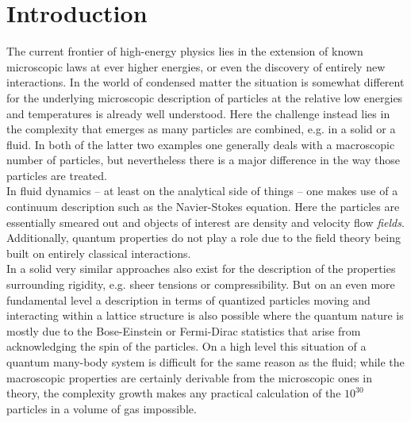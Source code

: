 \chapter{Introduction}\label{chap:int}
The current frontier of high-energy physics lies in the extension of known microscopic laws at ever higher energies, or even the discovery of entirely new interactions.
In the world of condensed matter the situation is somewhat different for the underlying microscopic description of particles at the relative low energies and temperatures is already well understood.
Here the challenge instead lies in the complexity that emerges as many particles are combined, e.g. in a solid or a fluid.
In both of the latter two examples one generally deals with a macroscopic number of particles, but nevertheless there is a major difference in the way those particles are treated.\\
In fluid dynamics -- at least on the analytical side of things -- one makes use of a continuum description such as the Navier-Stokes equation.
Here the particles are essentially smeared out and objects of interest are density and velocity flow \emph{fields}.
Additionally, quantum properties do not play a role due to the field theory being built on entirely classical interactions.\\
In a solid very similar approaches also exist for the description of the properties surrounding rigidity, e.g. sheer tensions or compressibility.
But on an even more fundamental level a description in terms of quantized particles moving and interacting within a lattice structure is also possible where the quantum nature is mostly due to the Bose-Einstein or Fermi-Dirac statistics that arise from acknowledging the spin of the particles.
On a high level this situation of a quantum many-body system is difficult for the same reason as the fluid; while the macroscopic properties are certainly derivable from the microscopic ones in theory, the complexity growth makes any practical calculation of the $10^{30}$ particles in a volume of gas impossible.
